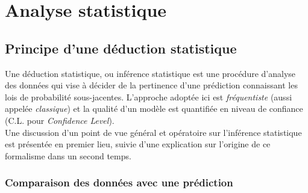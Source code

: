 

\chapter{Analyse statistique}
\label{chap:chapitre_stat}


\minitoc

\newpage

\section{Principe d'une déduction statistique}

Une déduction statistique, ou inférence statistique est une procédure d'analyse des données qui vise à décider de la pertinence d'une prédiction connaissant les lois de probabilité sous-jacentes. L'approche adoptée ici est \textit{fréquentiste} (aussi appelée \textit{classique}) et la qualité d'un modèle est quantifiée en niveau de confiance (\og C.L. \fg{} pour \textit{Confidence Level}).\\

Une discussion d'un point de vue général et opératoire sur l'inférence statistique est présentée en premier lieu, suivie d'une explication sur l'origine de ce formalisme dans un second temps.

\bigbreak

\subsection{Comparaison des données avec une prédiction}

